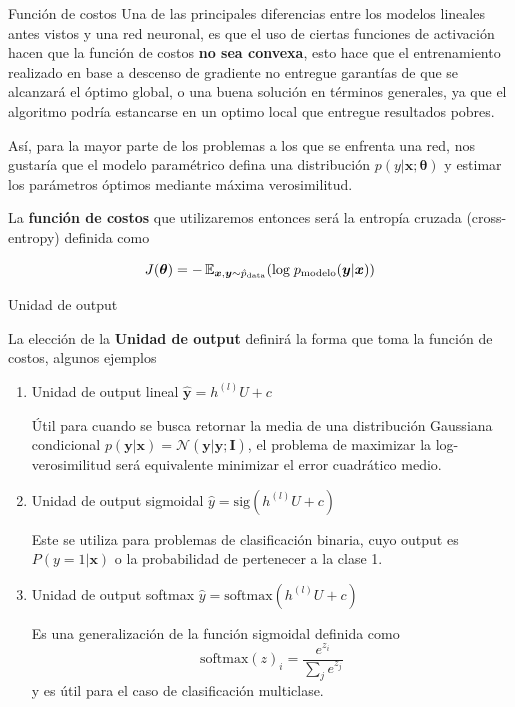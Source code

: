 \documentclass[9pt]{beamer}
\begin{document}
\begin{frame}{Función de costos}
Una de las principales diferencias entre los modelos lineales antes vistos y una red neuronal, es que el uso de ciertas funciones de activación hacen que la función de costos \textbf{no sea convexa}, esto hace que el entrenamiento realizado en base a descenso de gradiente no entregue garantías de que se alcanzará el óptimo global, o una buena solución en términos generales, ya que el algoritmo podría estancarse en un optimo local que entregue resultados pobres. \pause 
\vspace{0.2cm}

Así, para la mayor parte de los problemas a los que se enfrenta una red, nos gustaría que el modelo paramétrico defina una distribución $p(y|\bm{x}; \bm{\theta})$ y estimar los parámetros óptimos mediante máxima verosimilitud. \pause

La \textbf{función de costos} que utilizaremos entonces será la entropía cruzada (cross-entropy) definida como \pause 

\begin{equation*}
J(\bm{\theta}) = -\operatorname{\mathbb{E}}_{\bm{x},\bm{y}\sim \hat{p}_{\textrm{data}}}(\textrm{log}\; p_{\textrm{modelo}}(\bm{y}|\bm{x}))
\end{equation*}


\end{frame}
     
\begin{frame}{Unidad de output}

La elección de la \textbf{Unidad de output} definirá la forma que toma la función de costos, algunos ejemplos 
\begin{enumerate}
  \item Unidad de output lineal $\hat{\bm{y}} = h^{(l)}U + c$ \pause

  Útil para cuando se busca retornar la media de una distribución Gaussiana condicional $p(\bm{y}|\bm{x}) = \mathcal{N}(\bm{y}|\hat{\bm{y}};\bm{I})$, el problema de maximizar la log-verosimilitud será equivalente minimizar el error cuadrático medio. \pause

  \item Unidad de output sigmoidal $\hat{{y}} = \text{sig}(h^{(l)}U + c)$ \pause

  Este se utiliza para problemas de clasificación binaria, cuyo output es $P(y=1|\bm{x})$ o la probabilidad de pertenecer a la clase 1. \pause

  \item Unidad de output softmax $\hat{{y}} = \text{softmax}(h^{(l)}U + c)$ \pause 

  Es una generalización de la función sigmoidal definida como 
  \begin{equation*}
  \text{softmax}(z)_i = \frac{e^{z_i}}{\sum_{j}e^{z_j}}
  \end{equation*}
  y es útil para el caso de clasificación multiclase. 
\end{enumerate}

\end{frame}

\begin{frame}


\end{frame}


%
\end{document}
